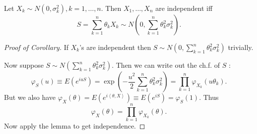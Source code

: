 \begin{corollary}
	Let $X_k \sim N(0,\sigma_k^2), k = 1,\ldots, n$. Then $X_1, \ldots, X_n$ are independent iff
	\[
		S = \sum_{k=1}^{n} \theta_k X_k \sim N\left(0,\sum_{k=1}^{n} \theta_k^2 \sigma_k^2\right)
	.\] 
\end{corollary}
\begin{proof}[Proof of Corollary]
	If $X_k$'s are independent then $S\sim 
	N\left(0,\sum_{k=1}^{n} \theta_k^2 \sigma_k^2\right)$ trivially. 

	Now suppose $S \sim  N\left( \sum_{k=1}^{n} \theta_k^2 \sigma_k^2 \right) $. Then we can write out the ch.f. of $S$ :
	\[
		\varphi_S(u) \equiv E\left( e^{i u S} \right) = \exp\left( - \frac{u^2}{2} \sum_{k=1}^{n} \theta_k^2 \sigma_k^2 \right) 
		= \prod_{k = 1}^{n} \varphi_{X_k} (u \theta_k) 
	.\] 
	But we also have $\varphi_X(\theta) = E\left( e^{i \left\langle \theta, X \right\rangle } \right) \equiv E\left( e^{i S} \right) = \varphi_S(1)$. Thus
	\[
		\varphi_X(\theta) = \prod_{k=1}^{n} \varphi_{X_k}(\theta) 
	.\] 
	Now apply the lemma to get independence.
\end{proof}

